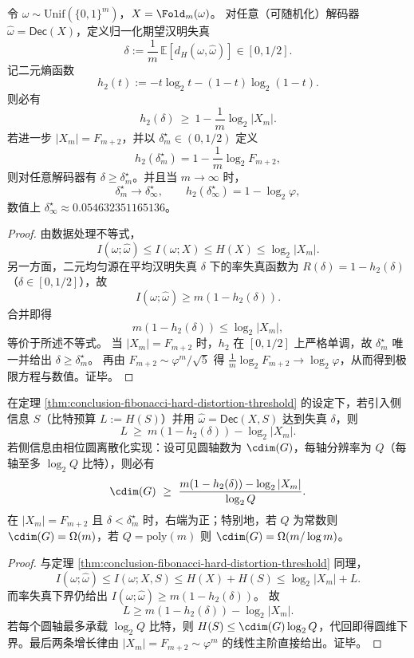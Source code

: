 \begin{theorem}\label{thm:conclusion-fibonacci-hard-distortion-threshold}
令 \(\omega\sim\mathrm{Unif}(\{0,1\}^m)\)，\(X=\Fold_m(\omega)\)。
对任意（可随机化）解码器 \(\widehat\omega=\mathsf{Dec}(X)\)，定义归一化期望汉明失真
\[
\delta:=\frac1m\,\mathbb E[d_H(\omega,\widehat\omega)]\in[0,1/2].
\]
记二元熵函数
\[
h_2(t):=-t\log_2 t-(1-t)\log_2(1-t).
\]
则必有
\[
h_2(\delta)\ \ge\ 1-\frac1m\log_2|X_m|.
\]
若进一步 \(|X_m|=F_{m+2}\)，并以 \(\delta_m^\star\in(0,1/2)\) 定义
\[
h_2(\delta_m^\star)=1-\frac1m\log_2F_{m+2},
\]
则对任意解码器有 \(\delta\ge\delta_m^\star\)。并且当 \(m\to\infty\) 时，
\[
\delta_m^\star\to\delta_\infty^\star,\qquad
h_2(\delta_\infty^\star)=1-\log_2\varphi,
\]
数值上 \(\delta_\infty^\star\approx 0.054632351165136\)。
\end{theorem}
\begin{proof}
由数据处理不等式，
\[
I(\omega;\widehat\omega)\le I(\omega;X)\le H(X)\le \log_2|X_m|.
\]
另一方面，二元均匀源在平均汉明失真 \(\delta\) 下的率失真函数为 \(R(\delta)=1-h_2(\delta)\)（\(\delta\in[0,1/2]\)），故
\[
I(\omega;\widehat\omega)\ge m(1-h_2(\delta)).
\]
合并即得
\[
m(1-h_2(\delta))\le \log_2|X_m|,
\]
等价于所述不等式。
当 \(|X_m|=F_{m+2}\) 时，\(h_2\) 在 \([0,1/2]\) 上严格单调，故 \(\delta_m^\star\) 唯一并给出 \(\delta\ge\delta_m^\star\)。
再由 \(F_{m+2}\sim \varphi^m/\sqrt5\) 得
\(
\frac1m\log_2F_{m+2}\to\log_2\varphi
\)，从而得到极限方程与数值。证毕。
\end{proof}

\begin{corollary}[侧信息预算与圆维下界]\label{cor:conclusion-sideinfo-distortion-cdim-lower-bound}
在定理 \ref{thm:conclusion-fibonacci-hard-distortion-threshold} 的设定下，若引入侧信息 \(S\)（比特预算 \(L:=H(S)\)）并用 \(\widehat\omega=\mathsf{Dec}(X,S)\) 达到失真 \(\delta\)，则
\[
L\ \ge\ m(1-h_2(\delta))-\log_2|X_m|.
\]
若侧信息由相位圆离散化实现：设可见圆轴数为 \(\cdim(G)\)，每轴分辨率为 \(Q\)（每轴至多 \(\log_2 Q\) 比特），则必有
\[
\cdim(G)\ \ge\
\frac{m(1-h_2(\delta))-\log_2|X_m|}{\log_2 Q}.
\]
在 \(|X_m|=F_{m+2}\) 且 \(\delta<\delta_m^\star\) 时，右端为正；特别地，若 \(Q\) 为常数则 \(\cdim(G)=\Omega(m)\)，若 \(Q=\mathrm{poly}(m)\) 则 \(\cdim(G)=\Omega(m/\log m)\)。
\end{corollary}
\begin{proof}
与定理 \ref{thm:conclusion-fibonacci-hard-distortion-threshold} 同理，
\[
I(\omega;\widehat\omega)\le I(\omega;X,S)\le H(X)+H(S)\le \log_2|X_m|+L.
\]
而率失真下界仍给出
\(
I(\omega;\widehat\omega)\ge m(1-h_2(\delta))
\)。
故
\[
L\ge m(1-h_2(\delta))-\log_2|X_m|.
\]
若每个圆轴最多承载 \(\log_2Q\) 比特，则 \(H(S)\le \cdim(G)\log_2Q\)，代回即得圆维下界。最后两条增长律由 \(|X_m|=F_{m+2}\sim\varphi^m\) 的线性主阶直接给出。证毕。
\end{proof}

